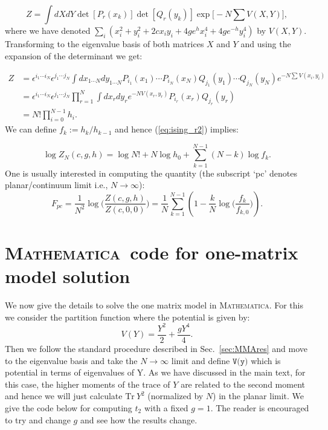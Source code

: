 \documentclass[letter,11pt]{article}
\newcommand{\MA}{\textsc{Mathematica}}
\begin{document}
\begin{equation}
	Z = \int dX dY \det[P_{r}(x_k)] \det[Q_{r}(y_k)] \exp\Big[-N \sum V(X,Y)\Big], 
\end{equation}
where we have denoted $\sum_{i} (x_{i}^2 + y_{i}^{2} +2c x_{i}y_{i} + 4ge^{h}x_{i}^{4} + 4ge^{-h}y_{i}^4)$ by $V(X,Y)$. 
Transforming to the eigenvalue basis of both matrices $X$ and $Y$ and using the expansion of the determinant we get:

\begin{align}
	Z &= \epsilon^{i_1 \cdots i_N} \epsilon^{j_1 \cdots j_N} \int dx_{1 \cdots N}
	dy_{1 \cdots N} P_{i_{1}}(x_1) \cdots P_{i_{N}}(x_N)
	Q_{j_{1}}(y_1) \cdots Q_{j_{N}}(y_N)
	e^{-N \sum V(x_i,y_i)} \nonumber  \\  
	&= \epsilon^{i_1 \cdots i_N} \epsilon^{j_1 \cdots j_N} \prod_{r=1}^{N} \int dx_{r} dy_{r} e^{-N V(x_r, y_r)} P_{i_r}(x_r) Q_{j_r}(y_r) \nonumber  \\  
	&=  N! \prod_{i=0}^{N-1} h_{i}.  
	\label{eq:ising_r2}
\end{align}
We can define $f_{k} := h_k/h_{k-1}$ and hence 
(\ref{eq:ising_r2}) implies:

\begin{equation}
	\log Z_{N}(c,g,h) = \log N! + N \log h_0 + \sum_{k=1}^{N-1} (N-k) \log f_{k} . 
\end{equation}
One is usually interested in computing the quantity (the subscript `pc' denotes planar/continuum limit i.e., $ N \to \infty$):
\begin{equation}
	F_{pc} = \frac{1}{N^2} \log\Bigg( \frac{Z(c,g,h)}{Z(c,0,0)}\Bigg) = \frac{1}{N} \sum_{k=1}^{N-1} \left(1 - \frac{k}{N} \log \Big(\frac{f_k}{f_{k,0}}\Big)\right). 
\end{equation}

\section{\label{sec:math_code}\MA~code for one-matrix model solution}

We now give the details to solve the one matrix model in \MA. For this we consider the partition function where the potential is given by:
\[ V(Y) = \frac{Y^2}{2} + \frac{gY^4}{4}.\] 
Then we follow the standard procedure described in Sec.~\ref{sec:MMAres} and move to the eigenvalue basis and take the $N \to \infty$ limit and define $\texttt{V(y)}$ which is potential in terms of eigenvalues of Y. As we have discussed in the main text, for this case, the higher moments of the trace of $Y$ are related to the second moment and hence we will just calculate $\mbox{Tr}~Y^2$ (normalized by $N$) in the planar limit. We give the code below for computing $t_{2}$ with a fixed $g=1$. The reader is encouraged to try and change $g$ and see how the results change.
\end{document}
